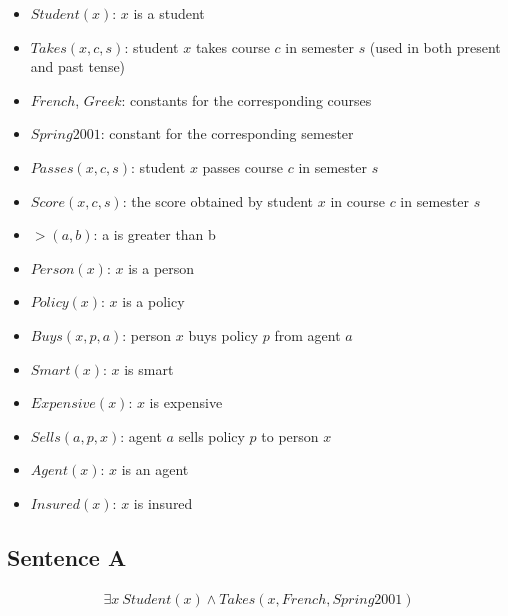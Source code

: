 \begin{itemize}

\item $Student(x)$: $x$ is a student

\item $Takes(x, c, s)$: student $x$ takes course $c$ in semester $s$ (used in both present and past tense)

\item $French$, $Greek$: constants for the corresponding courses

\item $Spring2001$: constant for the corresponding semester

\item $Passes(x, c, s)$: student $x$ passes course $c$ in semester $s$

\item $Score(x, c, s)$: the score obtained by student $x$ in course $c$ in semester $s$

\item $>(a, b)$: a is greater than b

\item $Person(x)$: $x$ is a person

\item $Policy(x)$: $x$ is a policy

\item $Buys(x, p, a)$: person $x$ buys policy $p$ from agent $a$

\item $Smart(x)$: $x$ is smart

\item $Expensive(x)$: $x$ is expensive

\item $Sells(a, p, x)$: agent $a$ sells policy $p$ to person $x$

\item $Agent(x)$: $x$ is an agent

\item $Insured(x)$: $x$ is insured

\end{itemize} 

\subsection*{Sentence A}

\begin{gather*}
\exists x \ Student(x) \land Takes(x, French, Spring2001)
\end{gather*}


